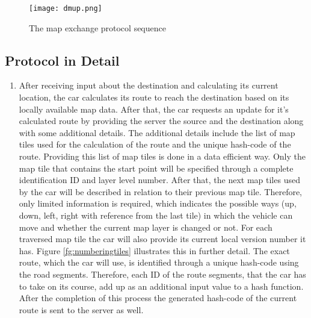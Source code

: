\begin{figure}
\centering
\texttt{[image: dmup.png]}
\caption{The map exchange protocol sequence}
\label{fg:protocol}
\end{figure}



\subsection{Protocol in Detail}
\begin{enumerate}
\item After receiving input about the destination and calculating its current location, the car calculates its route to reach the destination based on its locally available map data. After that, the car requests an update for it's calculated route by providing the server the source and the destination along with some additional details. The additional details include the list of map tiles used for the calculation of the route and the unique hash-code of the route. Providing this list of map tiles is done in a data efficient way. Only the map tile that contains the start point will be specified through a complete identification ID and layer level number. After that, the next map tiles used by the car will be described in relation to their previous map tile. Therefore, only limited information is required, which indicates the possible ways (up, down, left, right with reference from the last tile) in which the vehicle can move and whether the current map layer is changed or not. For each traversed map tile the car will also provide its current local version number it has. Figure \ref{fg:numberingtiles} illustrates this in further detail. The exact route, which the car will use, is identified through a unique hash-code using the road segments. Therefore, each ID of the route segments, that the car has to take on its course, add up as an additional input value to a hash function. After the completion of this process the generated hash-code of the current route is sent to the server as well.


\end{enumerate}
